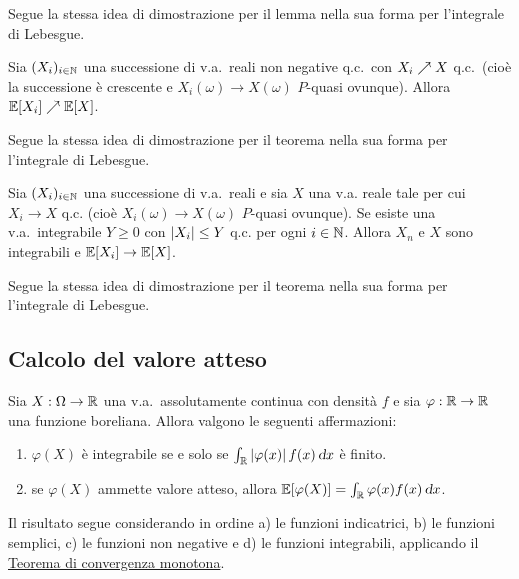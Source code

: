\begin{multicols*}{2}
\begin{lemma}[di Fatou]
    Segue la stessa idea di dimostrazione per il lemma nella sua forma per l'integrale di Lebesgue.
\end{lemma}

\begin{theorem}
    \label{th:convergenza_monotona}
    Sia $(X_i)_{i \in \mathbb{N}}$ una successione di v.a.~reali non negative q.c.~con
    $X_i \nearrow X$ q.c.~(cioè la successione è crescente e
    $X_i(\omega) \to X(\omega)$ $P$-quasi ovunque). Allora $\mathbb{E}[X_i] \nearrow \mathbb{E}[X]$. \smallskip


    Segue la stessa idea di dimostrazione per il teorema nella sua forma per l'integrale di Lebesgue.
\end{theorem}

\begin{theorem}
    Sia $(X_i)_{i \in \mathbb{N}}$ una successione di v.a.~reali e sia $X$ una v.a. reale tale per cui
    $X_i \to X$ q.c. (cioè $X_i(\omega) \to X(\omega)$ $P$-quasi ovunque). Se esiste una
    v.a.~integrabile $Y \geq 0$ con $\left\lvert X_i \right\rvert \leq Y$ q.c. per ogni $i \in \mathbb{N}$. Allora $X_n$ e
    $X$ sono integrabili e $\mathbb{E}[X_i] \to \mathbb{E}[X]$. \smallskip


    Segue la stessa idea di dimostrazione per il teorema nella sua forma per l'integrale di Lebesgue.
\end{theorem}

\subsection{Calcolo del valore atteso}

\begin{proposition}
    Sia $X : \Omega \to \mathbb{R}$ una v.a.~assolutamente continua con densità $f$
    e sia $\varphi : \mathbb{R} \to \mathbb{R}$ una funzione
    boreliana. Allora valgono le seguenti affermazioni:
    \begin{enumerate}[(i.)]
        \item $\varphi(X)$ è integrabile se e solo se $\int_\RR \abs{\varphi(x)} f(x) \dx$ è finito.
        \item se $\varphi(X)$ ammette valore atteso, allora $\EE[\varphi(X)] = \int_\RR \varphi(x) f(x) \dx$.
    \end{enumerate}
    Il risultato segue considerando in ordine a) le funzioni indicatrici, b) le funzioni semplici,
    c) le funzioni non negative e d) le funzioni integrabili, applicando il
    \hyperref[th:convergenza_monotona]{Teorema di convergenza monotona}. 
\end{proposition}

\end{multicols*}